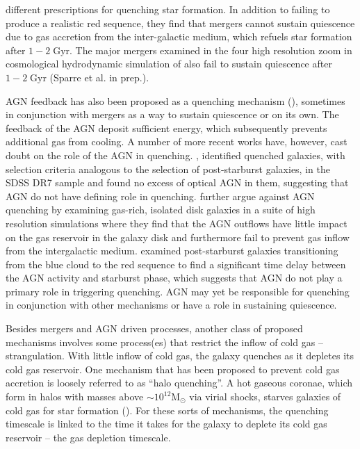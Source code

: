 \documentclass[iop,apj,tighten,twocolappendix,numberedappendix]{emulateapj}
\begin{document}
different prescriptions for quenching star formation. In addition to failing 
to produce a realistic red sequence, they find that mergers cannot 
sustain quiescence due to gas accretion from the inter-galactic medium, which
refuels star formation after $1-2\;\mathrm{Gyr}$. The 
major mergers examined in the four high resolution zoom in cosmological 
hydrodynamic simulation of \cite{Sparre:2016aa} also fail to sustain 
quiescence after $1-2\;\mathrm{Gyr}$ (Sparre et al. in prep.).

AGN feedback has also been proposed as a quenching mechanism 
(\citealt{Kauffmann:2000aa, Croton:2006aa, Hopkins:2008ab,van-de-Voort:2011aa}), 
sometimes in conjunction with mergers as a way to sustain quiescence or on its
own. The feedback of the AGN deposit sufficient energy, which subsequently 
prevents additional gas from cooling. A number of more recent works have, 
however, cast doubt on the role of the AGN in quenching. \cite{Mendel:2013aa}, 
identified quenched galaxies, with selection criteria analogous to the 
selection of post-starburst galaxies, in the SDSS DR7 sample and found 
no excess of optical AGN in them, suggesting that AGN do not have 
defining role in quenching. \cite{Gabor:2014aa} further argue against AGN quenching 
by examining gas-rich, isolated disk galaxies in a suite of 
high resolution simulations where they find that the AGN outflows 
have little impact on the gas reservoir in the galaxy disk and 
furthermore fail to prevent gas inflow from the intergalactic medium.
\cite{Yesuf:2014aa} examined post-starburst galaxies transitioning from the 
blue cloud to the red sequence to find a significant time delay between the 
AGN activity and starburst phase, which suggests that AGN do not play a primary 
role in triggering quenching. AGN may yet be responsible for 
quenching in conjunction with other mechanisms or have a role 
in sustaining quiescence. 


Besides mergers and AGN driven processes, another class of 
proposed mechanisms involves some process(es) that restrict the 
inflow of cold gas -- strangulation. With little
inflow of cold gas, the galaxy quenches as it depletes its 
cold gas reservoir. One mechanism that has been proposed 
to prevent cold gas accretion is loosely referred to as ``halo quenching''. 
A hot gaseous coronae, which form in halos with masses above 
$\sim 10^{12}\mathrm{M}_\odot$ via virial shocks, starves 
galaxies of cold gas for star formation (\citealt{Birnboim:2003aa, 
Keres:2005aa, Cattaneo:2006aa, Dekel:2006aa, Birnboim:2007aa, Gabor:2012aa, 
Gabor:2015aa}). 
For these sorts of mechanisms, the quenching timescale is 
linked to the time it takes for the galaxy to deplete its cold gas 
reservoir -- the gas depletion timescale. 
\end{document}
